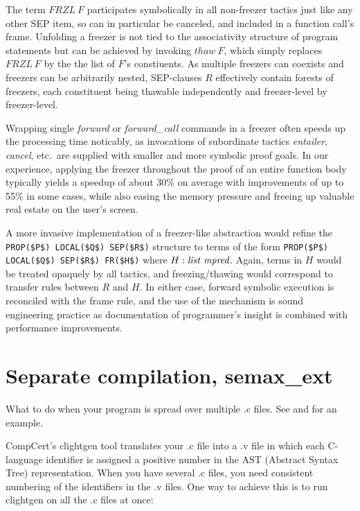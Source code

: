 \documentclass[12pt,fleqn,openany,oneside,showtrims]{memoir}
\begin{document}
The term $\mathit{FRZL}\ F$ participates symbolically in all
non-freezer tactics just like any other SEP item, so can in particular
be canceled, and included in a function call's frame.  Unfolding a
freezer is not tied to the associativity structure of program
statements but can be achieved by invoking $\mathit{thaw}\ F$, which
simply replaces $\mathit{FRZL}\ F$ by the the list of $F$'s
constiuents.  As multiple freezers can coexists and freezers can be
arbitrarily nested, SEP-clauses $R$ effectively contain forests of
freezers, each constituent being thawable independently and
freezer-level by freezer-level.

Wrapping single \emph{forward} or \emph{forward\_call} commands in a
freezer often speeds up the processing time noticably, as invocations
of subordinate tactics \emph{entailer}, \emph{cancel}, etc.~are
supplied with smaller and more symbolic proof goals. In our
experience, applying the freezer throughout the proof of an entire
function body typically yields a speedup of about 30\% on average with
improvements of up to 55\% in some cases, while also easing the memory
pressure and freeing up valuable real estate on the user's screen.


A more invasive implementation of a freezer-like abstraction would
refine the \lstinline{PROP($P$) LOCAL($Q$) SEP($R$)} structure to
terms of the form \lstinline{PROP($P$) LOCAL($Q$) SEP($R$) FR($H$)}
where $H: \emph{list\ mpred}$. Again, terms in $H$ would be treated
opaquely by all tactics, and freezing/thawing would correspond to
transfer rules between $R$ and $H$. In either case, forward symbolic
execution is reconciled with the frame rule, and the use of the
mechanism is sound engineering practice as documentation of
programmer's insight is combined with performance improvements.

\chapter{Separate compilation, \upshape\textsf{semax\_ext}}
\label{refcard:sepcomp}

What to do when your program is spread over multiple .c files.
See  and  for an example.


CompCert's clightgen tool translates your .c file into a .v file
in which each C-language identifier is assigned a positive number
in the AST (Abstract Syntax Tree) representation.  When you have
several .c files, you need consistent numbering of the identifiers
in the .v files.  One way to achieve this is to run clightgen
on all the .c files at once:
\end{document}
